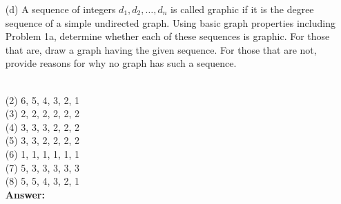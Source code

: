 \documentclass[12pt]{article}
\newcommand{\vs}{\vspace{2mm}}
\begin{document}
\begin{itemize}
\begin{proof}
\begin{itemize}
    \item[4.] \textbf{Total Time Complexity:}  The overall time complexity is the sum of the time spent on initialization, vertex exploration, and edge exploration, which gives
    \[
    O(|V| + |V| + |V|^2) = O(|V|^2).
    \]
\end{itemize}
\end{proof}

\item[(d)] A sequence of integers $d_1, d_2, \ldots , d_n$ is called graphic if it is the degree sequence of a simple undirected graph. Using basic graph properties including Problem 1a, determine whether each of these sequences is graphic. For those that are, draw a graph having the given sequence. For those that are not, provide  reasons for why no graph has such a sequence. 
\vs\

\\
(2) 6, 5, 4, 3, 2, 1 \\
(3) 2, 2, 2, 2, 2, 2 \\
(4) 3, 3, 3, 2, 2, 2 \\
(5) 3, 3, 2, 2, 2, 2 \\
(6) 1, 1, 1, 1, 1, 1 \\
(7) 5, 3, 3, 3, 3, 3 \\
(8) 5, 5, 4, 3, 2, 1 \\

\textbf{Answer:}


\end{itemize}
\end{document}
